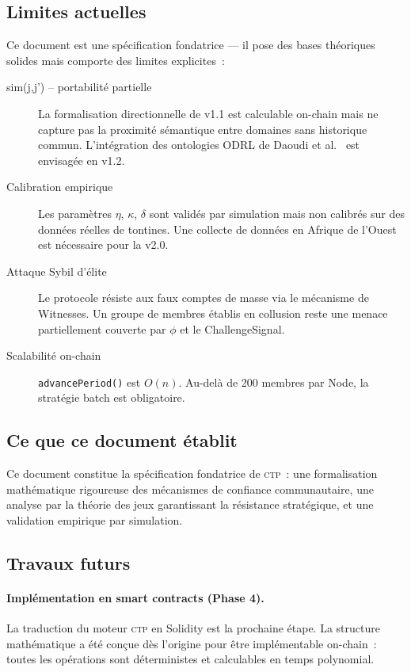 \documentclass[12pt,a4paper]{article}
\theoremstyle{definition}
\theoremstyle{plain}
\theoremstyle{remark}
\newcommand{\CTP}{\textsc{ctp}}
\newcommand{\1}{\mathbf{1}}
\begin{document}
\subsection{Limites actuelles}

Ce document est une spécification fondatrice --- il pose des bases
théoriques solides mais comporte des limites explicites~:

\begin{description}
  \item[sim(j,j') -- portabilité partielle] La formalisation directionnelle
    de v1.1 est calculable on-chain mais ne capture pas la proximité
    sémantique entre domaines sans historique commun. L'intégration des
    ontologies ODRL de Daoudi et al.~\cite{daoudi2026negotiation} est
    envisagée en v1.2.

  \item[Calibration empirique] Les paramètres $\eta$, $\kappa$, $\delta$
    sont validés par simulation mais non calibrés sur des données réelles
    de tontines. Une collecte de données en Afrique de l'Ouest est
    nécessaire pour la v2.0.

  \item[Attaque Sybil d'élite] Le protocole résiste aux faux comptes de
    masse via le mécanisme de Witnesses. Un groupe de membres établis en
    collusion reste une menace partiellement couverte par $\phi$ et le
    ChallengeSignal.

  \item[Scalabilité on-chain] \texttt{advancePeriod()} est $O(n)$.
    Au-delà de 200 membres par Node, la stratégie batch est obligatoire.
\end{description}

\subsection{Ce que ce document établit}

Ce document constitue la spécification fondatrice de \CTP{}~:
une formalisation mathématique rigoureuse des mécanismes de confiance
communautaire, une analyse par la théorie des jeux garantissant la résistance
stratégique, et une validation empirique par simulation.

\subsection{Travaux futurs}

\paragraph{Implémentation en smart contracts (Phase 4).}
La traduction du moteur \CTP{} en Solidity est la prochaine étape. La
structure mathématique a été conçue dès l'origine pour être implémentable
on-chain~: toutes les opérations sont déterministes et calculables en temps
polynomial.
\end{document}
